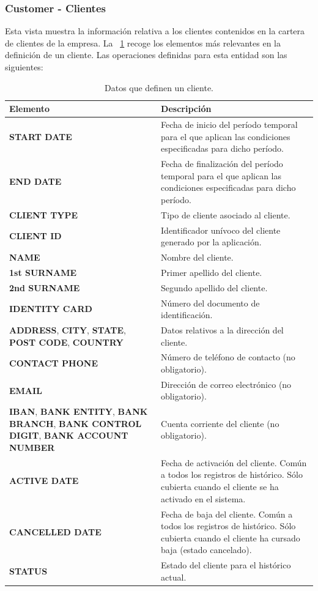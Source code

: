 \subsubsection{Customer - Clientes}
\label{sub:customer}

Esta vista muestra la información relativa a los clientes contenidos en la cartera de clientes de la empresa. La \tablename~\ref{tab:cliente} recoge los elementos más relevantes en la definición de un cliente.
Las operaciones definidas para esta entidad son las siguientes:

\begin{table}
  \centering
  \setlength{\leftmargini}{0.4cm}
  \resizebox{14cm}{!} {
  \begin{tabular}{|m{6cm} m{8cm}|}
  \rowcolor{udcpink!25}
  \hline
  	\textbf{Elemento} & \textbf{Descripción} \\\hline
  	\textbf{START DATE} & Fecha de inicio del período temporal para el que aplican las condiciones especificadas para dicho período.\\
  	\textbf{END DATE} & Fecha de finalización del período temporal para el que aplican las condiciones especificadas para dicho período.\\
	\textbf{CLIENT TYPE} & Tipo de cliente asociado al cliente.\\
	\textbf{CLIENT ID} & Identificador unívoco del cliente generado por la aplicación.\\
	\textbf{NAME} & Nombre del cliente.\\
	\textbf{1st SURNAME} & Primer apellido del cliente.\\
	\textbf{2nd SURNAME} & Segundo apellido del cliente.\\
	\textbf{IDENTITY CARD} & Número del documento de identificación.\\	
	\textbf{ADDRESS}, \textbf{CITY}, \textbf{STATE}, \textbf{POST CODE}, \textbf{COUNTRY}  & Datos relativos a la dirección del cliente.\\	
	\textbf{CONTACT PHONE} & Número de teléfono de contacto (no obligatorio).\\
	\textbf{EMAIL} & Dirección de correo electrónico (no obligatorio).\\
	\textbf{IBAN}, \textbf{BANK ENTITY}, \textbf{BANK BRANCH}, \textbf{BANK CONTROL DIGIT}, \textbf{BANK ACCOUNT NUMBER} & Cuenta corriente del cliente (no obligatorio).\\
	\textbf{ACTIVE DATE} & Fecha de activación del cliente. Común a todos los registros de histórico. Sólo cubierta cuando el cliente se ha activado en el sistema.\\
	\textbf{CANCELLED DATE} & Fecha de baja del cliente. Común a todos los registros de histórico. Sólo cubierta cuando el cliente ha cursado baja (estado cancelado).\\	
	\textbf{STATUS} & Estado del cliente para el histórico actual.	
	\\\hline
  \end{tabular}
  } %
  \caption{Datos que definen un cliente.}
  \label{tab:cliente}
\end{table}

